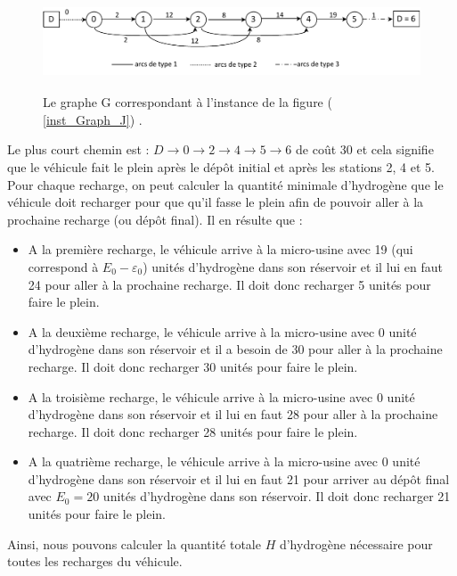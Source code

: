 \begin{figure}[H]
	\centerline{
		\includegraphics[height=2.9cm]{images_these/Graph_J.pdf}}
	\caption[Le graphe G]{Le graphe G correspondant à l'instance de la figure (	\ref{inst_Graph_J}) .}
	\label{Graph_J}
\end{figure}

Le plus court chemin est : $D \rightarrow 0 \rightarrow 2 \rightarrow 4 \rightarrow 5 \rightarrow 6$ de coût 30 et cela signifie que le véhicule fait le plein après le dépôt initial et après les stations 2, 4 et 5.
Pour chaque recharge, on peut calculer la quantité minimale d'hydrogène que le véhicule doit recharger pour que qu'il fasse le plein afin de pouvoir aller à la prochaine recharge (ou dépôt final). Il en résulte que :

\begin{itemize}[label=$\square$]
	\item A la première recharge, le véhicule arrive à la micro-usine avec 19 (qui correspond à $E_0- \varepsilon_0$) unités d'hydrogène dans son réservoir et il lui en faut 24 pour aller à la prochaine recharge. Il doit donc recharger 5 unités pour faire le plein.
	\item A la deuxième recharge, le véhicule arrive à la micro-usine avec 0 unité d'hydrogène dans son réservoir et il a besoin de 30 pour aller à la prochaine recharge. Il doit donc recharger 30 unités pour faire le plein.
	\item A la troisième recharge, le véhicule arrive à la micro-usine avec 0 unité d'hydrogène dans son réservoir et il lui en faut 28 pour aller à la prochaine recharge. Il doit donc recharger 28 unités pour faire le plein.
	\item A la quatrième recharge, le véhicule arrive à la micro-usine avec 0 unité d'hydrogène dans son réservoir et il lui en faut 21 pour arriver au dépôt final avec $E_0=20$ unités d'hydrogène dans son réservoir. Il doit donc recharger 21 unités pour faire le plein.
\end{itemize}
Ainsi, nous pouvons calculer la quantité totale $H$ d'hydrogène nécessaire pour toutes les recharges du véhicule.

